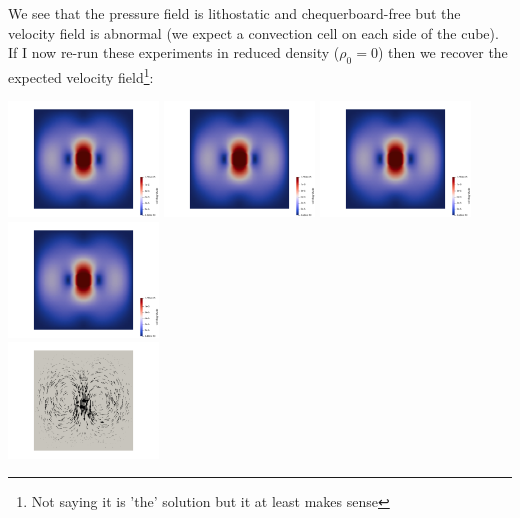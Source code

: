 We see that the pressure field is lithostatic and chequerboard-free  but the velocity field is abnormal 
(we expect a convection cell on each side of the cube).
If I now re-run these experiments in reduced density ($\rho_0=0$) then we recover
the expected velocity field\footnote{Not saying it is 'the' solution but it at least makes sense}:

\begin{center}
\includegraphics[width=4cm]{python_codes/fieldstone_77/results/block/reduced/vel1}
\includegraphics[width=4cm]{python_codes/fieldstone_77/results/block/reduced/vel2}
\includegraphics[width=4cm]{python_codes/fieldstone_77/results/block/reduced/vel3}
\includegraphics[width=4cm]{python_codes/fieldstone_77/results/block/reduced/vel4}\\
\includegraphics[width=4cm]{python_codes/fieldstone_77/results/block/reduced/vels1}

\end{center}
